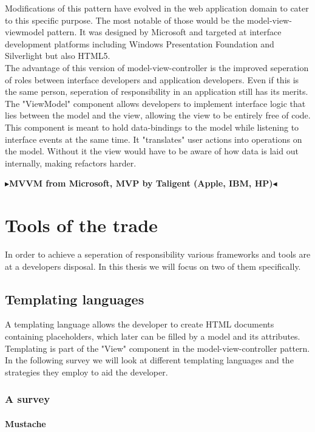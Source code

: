 \documentclass[twoside,11pt,openright]{report}
\newcommand{\todo}[1]{{\color[rgb]{.5,0,0}\textbf{$\blacktriangleright$#1$\blacktriangleleft$}}}
\begin{document}
Modifications of this pattern have evolved in the web application domain to
cater to this specific purpose. The most notable of those would be the
model-view-viewmodel pattern. It was designed by Microsoft and targeted at
interface development platforms including Windows Presentation Foundation and
Silverlight but also HTML5.\\
The advantage of this version of model-view-controller is the improved
seperation of roles between interface developers and application developers.
Even if this is the same person, seperation of responsibility in an application
still has its merits.\\
The "ViewModel" component allows developers to implement interface logic that
lies between the model and the view, allowing the view to be entirely free
of code. This component is meant to hold data-bindings to the model while
listening to interface events at the same time. It "translates" user actions
into operations on the model. Without it the view would have to be aware of how
data is laid out internally, making refactors harder.

\todo{MVVM from Microsoft, MVP by Taligent (Apple, IBM, HP)}


\chapter{Tools of the trade}
In order to achieve a seperation of responsibility various frameworks and tools
are at a developers disposal. In this thesis we will focus on two of them
specifically.
\section{Templating languages}
A templating language allows the developer to create HTML documents containing
placeholders, which later can be filled by a model and its attributes.
Templating is part of the "View" component in the model-view-controller
pattern. In the following survey we will look at different templating languages
and the strategies they employ to aid the developer.
\subsection{A survey}
\subsubsection{Mustache}
\end{document}
